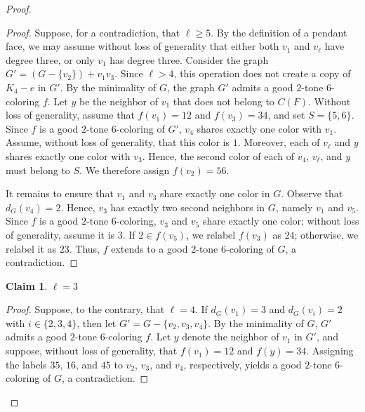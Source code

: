 \documentclass[12pt]{article}
\numberwithin{theorem}{section}
\numberwithin{conjecture}{section}
\numberwithin{corollary}{section}
\numberwithin{example}{section}
\numberwithin{lemma}{section}
\numberwithin{proposition}{section}
\numberwithin{problem}{section}
\numberwithin{remark}{section}
\newtheorem{claim}{Claim}
\numberwithin{claim}{theorem}
\numberwithin{definition}{section}
\begin{document}
\begin{proof}
\begin{proof}
Suppose, for a contradiction, that $\ell \ge 5$. By the definition of a pendant face, we may assume without loss of generality that either both $v_1$ and $v_\ell$ have degree three, or only $v_1$ has degree three. Consider the graph $G' = (G - \{v_2\}) + v_1v_3$. Since $\ell > 4$, this operation does not create a copy of $K_4 - e$ in $G'$. By the minimality of $G$, the graph $G'$ admits a good $2$-tone $6$-coloring $f$. Let $y$ be the neighbor of $v_1$ that does not belong to $C(F)$. Without loss of generality, assume that $f(v_1) = 12$ and $f(v_3) = 34$, and set $S = \{5,6\}$. Since $f$ is a good $2$-tone $6$-coloring of $G'$, $v_4$ shares exactly one color with $v_1$. Assume, without loss of generality, that this color is $1$. Moreover, each of $v_\ell$ and $y$ shares exactly one color with $v_3$. Hence, the second color of each of $v_4$, $v_\ell$, and $y$ must belong to $S$. We therefore assign $f(v_2) = 56$.

\noindent It remains to ensure that $v_1$ and $v_3$ share exactly one color in $G$. Observe that $d_G(v_4)=2$. Hence, $v_3$ has exactly two second neighbors in $G$, namely $v_1$ and $v_5$. Since $f$ is a good $2$-tone $6$-coloring, $v_3$ and $v_5$ share exactly one color; without loss of generality, assume it is $3$. If $2 \in f(v_5)$, we relabel $f(v_3)$ as $24$; otherwise, we relabel it as $23$. Thus, $f$ extends to a good $2$-tone $6$-coloring of $G$, a contradiction.\end{proof}

\begin{claim}
   $\ell= 3$
\end{claim}

\begin{proof}
 \noindent Suppose, to the contrary, that $\ell=4$. If $d_G(v_1)=3$ and $d_G(v_i)=2$ with $i\in \{2,3,4\}$, then let $G' = G - \{v_2,v_3,v_4\}$. By the minimality of $G$, $G'$ admits a good $2$-tone $6$-coloring $f$. Let $y$ denote the neighbor of $v_1$ in $G'$, and suppose, without loss of generality, that $f(v_1)=12$ and $f(y)=34$. Assigning the labels $35$, $16$, and $45$ to $v_2$, $v_3$, and $v_4$, respectively, yields a good $2$-tone $6$-coloring of $G$, a contradiction.
 

\end{proof}
\end{proof}
\end{document}
